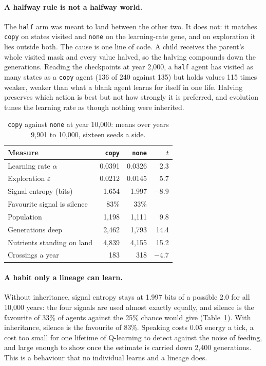 \documentclass[letterpaper]{article}
\newcommand{\cond}[1]{\texttt{#1}}
\begin{document}
\paragraph{A halfway rule is not a halfway world.} The \cond{half} arm was meant to land between the
other two. It does not: it matches \cond{copy} on states visited and \cond{none} on the learning-rate
gene, and on exploration it lies outside both. The cause is one line of code. A child receives the
parent's whole visited mask and every value halved, so the halving compounds down the generations.
Reading the checkpoints at year 2,000, a \cond{half} agent has visited as many states as a \cond{copy}
agent (136 of 240 against 135) but holds values 115 times weaker, weaker than what a blank agent
learns for itself in one life. Halving preserves which action is best but not how strongly it is
preferred, and evolution tunes the learning rate as though nothing were inherited.

\begin{table}[t]
\centering
\footnotesize
\caption{\cond{copy} against \cond{none} at year 10,000: means over years 9,901 to 10,000, sixteen
seeds a side.}
\label{tab:long}
\begin{tabular}{@{}lrrr@{}}
\toprule
Measure & \cond{copy} & \cond{none} & $t$ \\
\midrule
Learning rate $\alpha$       & 0.0391 & 0.0326 & 2.3 \\
Exploration $\varepsilon$    & 0.0212 & 0.0145 & 5.7 \\
Signal entropy (bits)        & 1.654  & 1.997  & $-8.9$ \\
Favourite signal is silence  & 83\%   & 33\%   & \\
Population                   & 1,198  & 1,111  & 9.8 \\
Generations deep             & 2,462  & 1,793  & 14.4 \\
Nutrients standing on land   & 4,839  & 4,155  & 15.2 \\
Crossings a year             & 183    & 318    & $-4.7$ \\
\bottomrule
\end{tabular}
\end{table}

\paragraph{A habit only a lineage can learn.} Without inheritance, signal entropy stays at 1.997 bits
of a possible 2.0 for all 10,000 years: the four signals are used almost exactly equally, and silence
is the favourite of 33\% of agents against the 25\% chance would give (Table~\ref{tab:long}). With
inheritance, silence is the favourite of 83\%. Speaking costs 0.05 energy a tick, a cost too small
for one lifetime of Q-learning to detect against the noise of feeding, and large enough to show once
the estimate is carried down 2,400 generations. This is a behaviour that no individual learns and a
lineage does.
\end{document}
